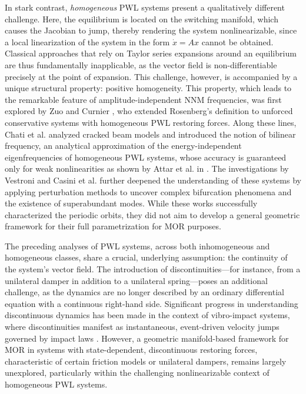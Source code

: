 \documentclass[a4paper,9pt,parskip=half,english]{article}
\theoremstyle{plain}
\theoremstyle{definition}
\begin{document}
In stark contrast, \textit{homogeneous} PWL systems present a qualitatively different challenge. Here, the equilibrium is located on the switching manifold, which causes the Jacobian to jump, thereby rendering the system nonlinearizable, since a local linearization of the system in the form $\dot{x} = A x$ cannot be obtained. Classical approaches that rely on Taylor series expansions around an equilibrium are thus fundamentally inapplicable, as the vector field is non-differentiable precisely at the point of expansion. This challenge, however, is accompanied by a unique structural property: positive homogeneity. This property, which leads to the remarkable feature of amplitude-independent NNM frequencies, was first explored by Zuo and Curnier \cite{Zuo1994}, who extended Rosenberg's definition to unforced conservative systems with homogeneous PWL restoring forces. Along these lines, Chati et al. \cite{Chati1997} analyzed cracked beam models and introduced the notion of bilinear frequency, an analytical approximation of the energy-independent eigenfrequencies of homogeneous PWL systems, whose accuracy is guaranteed only for weak nonlinearities as shown by Attar et al. in \cite{Attar2017}. The investigations by Vestroni and Casini et al. \cite{Casini2011,Casini2012,Casini2013,Vestroni2008} further deepened the understanding of these systems by applying perturbation methods to uncover complex bifurcation phenomena and the existence of superabundant modes. While these works successfully characterized the periodic orbits, they did not aim to develop a general geometric framework for their full parametrization for MOR purposes.

The preceding analyses of PWL systems, across both inhomogeneous and homogeneous classes, share a crucial, underlying assumption: the continuity of the system's vector field. The introduction of discontinuities—for instance, from a unilateral damper in addition to a unilateral spring—poses an additional challenge, as the dynamics are no longer described by an ordinary differential equation with a continuous right-hand side. Significant progress in understanding discontinuous dynamics has been made in the context of vibro-impact systems, where discontinuities manifest as instantaneous, event-driven velocity jumps governed by impact laws \cite{Thorin2015, Thorin2017,LeThi2018}. However, a geometric manifold-based framework for MOR in systems with state-dependent, discontinuous restoring forces, characteristic of certain friction models or unilateral dampers, remains largely unexplored, particularly within the challenging nonlinearizable context of homogeneous PWL systems.
\end{document}
